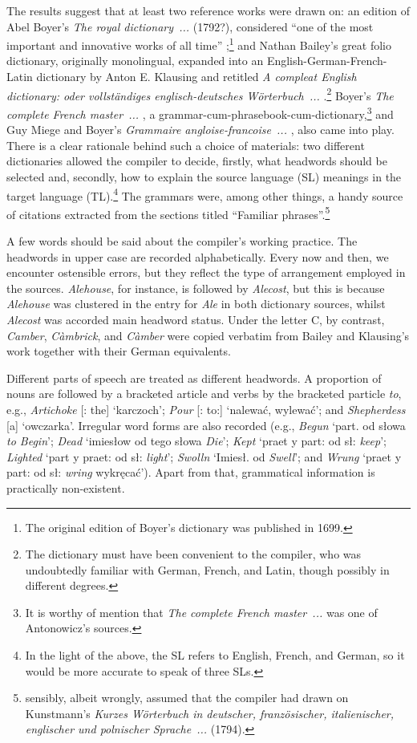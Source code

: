 \documentclass[output=paper,colorlinks,citecolor=brown,arabicfont,chinesefont]{langscibook}
\begin{document}
The results suggest that at least two reference works were drawn on: an edition of Abel Boyer’s \emph{The royal dictionary~...} (1792?), considered  “one of the most important and innovative works of all time” \citep[479--480]{CormierFernandez2005};\footnote{The original edition of Boyer’s dictionary was published in 1699.} and Nathan Bailey’s great folio dictionary, originally monolingual, expanded into an English-German-French-Latin dictionary by Anton E. Klausing and retitled \emph{A compleat English dictionary: oder vollständiges englisch-deutsches Wörterbuch~...} \citep{Bailey1771}.\footnote{The dictionary must have been convenient to the compiler, who was undoubtedly familiar with German, French, and Latin, though possibly in different degrees.} Boyer’s \emph{The complete French master~...} \citep{Boyer1762}, a grammar-cum-phrasebook-cum-dictionary,\footnote{It is worthy of mention that \emph{The complete French master~...} was one of Antonowicz’s sources.} and Guy Miege and Boyer’s \emph{Grammaire angloise-francoise~...} \citep{MiegeBoyer1763}, also came into play. There is a clear rationale behind such a choice of materials: two different dictionaries allowed the compiler to decide, firstly, what headwords should be selected and, secondly, how to explain the source language (SL) meanings in the target language (TL).\footnote{In the light of the above, the SL refers to English, French, and German, so it would be more accurate to speak of three SLs.} The grammars were, among other things, a handy source of citations extracted from the sections titled “Familiar phrases”.\footnote{\citet{Siekierska_krystyna1985} sensibly, albeit wrongly, assumed that the compiler had drawn on Kunstmann’s \emph{Kurzes Wörterbuch in deutscher, französischer, italienischer, englischer und polnischer Sprache~...} (1794).}

A few words should be said about the compiler’s working practice. The headwords in upper case are recorded alphabetically. Every now and then, we encounter ostensible errors, but they reflect the type of arrangement employed in the sources. \emph{Alehouse}, for instance, is followed by \emph{Alecost}, but this is because \emph{Alehouse} was clustered in the entry for \emph{Ale} in both dictionary sources, whilst \emph{Alecost} was accorded main headword status. Under the letter C, by contrast, \emph{Camber}, \emph{Càmbrick}, and \emph{Càmber} were copied verbatim from Bailey and Klausing’s work together with their German equivalents. 

Different parts of speech are treated as different headwords. A proportion of nouns are followed by a bracketed article and verbs by the bracketed particle \emph{to}, e.g., \emph{Artichoke} [: the] ‘karczoch’; \emph{Pour} [: to:] ‘nalewać, wylewać’; and \emph{Shepherdess} [a] ‘owczarka’. Irregular word forms are also recorded (e.g., \emph{Begun} ‘part. od słowa \emph{to Begin}’; \emph{Dead} ‘imiesłow od tego słowa \emph{Die}’; \emph{Kept} ‘praet y part: od sł: \emph{keep}’; \emph{Lighted} ‘part y praet: od sł: \emph{light}’; \emph{Swolln} ‘Imiesł. od \emph{Swell}’; and \emph{Wrung} ‘praet y part: od sł: \emph{wring} wykręcać’). Apart from that, grammatical information is practically non-existent. 
\end{document}
